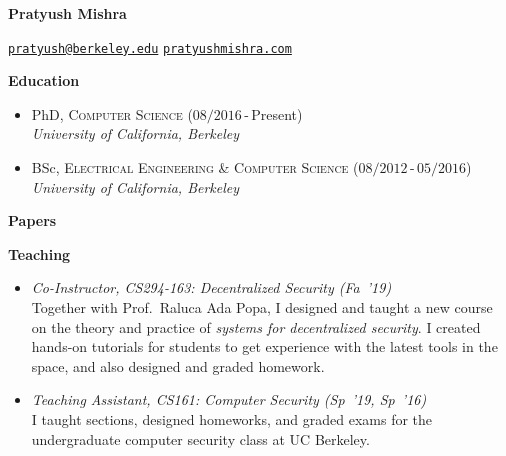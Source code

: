 \documentclass[11pt]{article}
\begin{document}
% 
\begin{cv}{\vspace{-5em}}
  \begin{center}
    \huge
    \textbf{Pratyush Mishra}
  \end{center}

  \href{mailto:pratyush@berkeley.edu}{\texttt{pratyush@berkeley.edu}}\hfill
  \href{http://www.pratyushmishra.com}{\texttt{pratyushmishra.com}}

  {\large \textbf{Education}}
  \begin{itemize}
    \item[] PhD, \textsc{Computer Science} (\small$08/2016$\,-\,Present)\\
    \emph{University of California, Berkeley}

  \item[] BSc, \textsc{Electrical Engineering \& Computer Science} (\small$08/2012$\,-\,$05/2016$)\\
    \emph{University of California, Berkeley}
  \end{itemize}
  {\large\textbf{Papers}}
  {
    \small
    \noindent
    \nocite{BuenzCMS20,MishraLSZP20,BoweCGMMW20,ChiesaHMMVW20,MishraPCCP18,ChiesaGLMMM17,CarliniMVZSSWZ16,HoLMHSW16,PortnoffLEMLW15}
    \printbibliography[title = {\small Conference publications}, type=inproceedings]
    \nocite{ChiesaLMZ21,LehmkuhlMSP21,BuenzCLMS20,BuenzMMTV19}
    \printbibliography[title = {\small Preprints}, type=misc]
  }


  {\clearpage\large\textbf{Teaching}}
  \begin{itemize}
    \item[] \emph{Co-Instructor, {CS294-163}: Decentralized Security (Fa~'19)}\\
      {\small
        Together with Prof.~Raluca Ada Popa, I designed and taught a new course on the theory and practice of \emph{systems for decentralized security}. I created hands-on tutorials for students to get experience with the latest tools in the space, and also designed and graded homework.
      }
    \item[] \emph{Teaching Assistant, {CS161}: Computer Security (Sp~'19, Sp~'16)}\\
      {\small
      I taught sections, designed homeworks, and graded exams for the undergraduate computer security class at UC Berkeley.}
  \end{itemize}


\end{cv}
\end{document}
